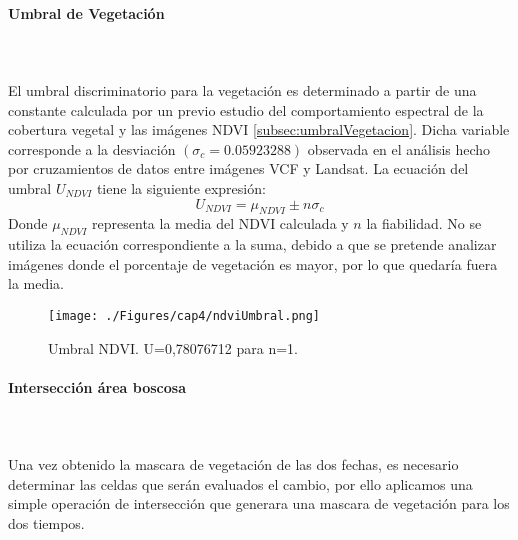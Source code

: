 \paragraph{Umbral de Vegetaci\'on}\label{sec:uvegetacion}\mbox{}\\\mbox{}\\
El umbral discriminatorio para la vegetaci\'on es determinado a partir de una constante calculada por un previo estudio del comportamiento espectral de la cobertura vegetal y las im\'agenes NDVI \ref{subsec:umbralVegetacion}. Dicha variable corresponde a la desviaci\'on $(\sigma_{c} = 0.05923288)  $ observada en el an\'alisis hecho por cruzamientos de datos entre im\'agenes VCF y Landsat. La ecuaci\'on del umbral $ U_{NDVI} $ tiene la siguiente expresi\'on:
		\begin{equation}
		U_{NDVI} = \mu_{NDVI}\pm n \sigma_{c}
		\end{equation}
Donde $ \mu_{NDVI} $ representa la media del NDVI calculada y $ n $ la fiabilidad. No se utiliza la ecuaci\'on correspondiente a la suma, debido a que se pretende analizar im\'agenes donde el porcentaje de vegetaci\'on es mayor, por lo que quedaría fuera la media.
\begin{figure}[H]
	\centering
	\texttt{[image: ./Figures/cap4/ndviUmbral.png]}
	\caption{Umbral NDVI. U=0,78076712 para n=1.}
	\label{fig:ndviUmbral}
\end{figure}

\paragraph{Intersecci\'on \'area boscosa }\mbox{}\\\mbox{}\\
Una vez obtenido la mascara de vegetaci\'on de las dos fechas, es necesario determinar las celdas que ser\'an evaluados el cambio, por ello aplicamos una simple operaci\'on de intersecci\'on que generara una mascara de vegetaci\'on para los dos tiempos.


